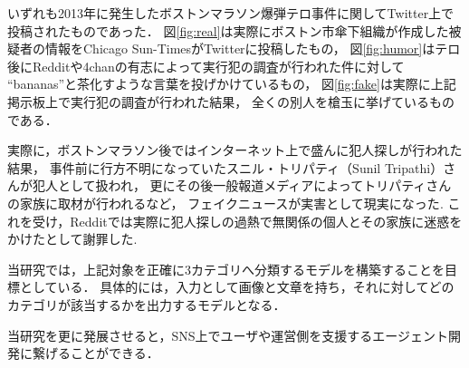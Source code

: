 いずれも2013年に発生したボストンマラソン爆弾テロ事件に関してTwitter上で投稿されたものであった．
図\ref{fig:real}は実際にボストン市傘下組織が作成した被疑者の情報をChicago Sun-TimesがTwitterに投稿したもの，
図\ref{fig:humor}はテロ後にRedditや4chanの有志によって実行犯の調査が行われた件に対して
``bananas''と茶化すような言葉を投げかけているもの，
図\ref{fig:fake}は実際に上記掲示板上で実行犯の調査が行われた結果，
全くの別人を槍玉に挙げているものである．

実際に，ボストンマラソン後ではインターネット上で盛んに犯人探しが行われた結果，
事件前に行方不明になっていたスニル・トリパティ（Sunil Tripathi）さんが犯人として扱われ，
更にその後一般報道メディアによってトリパティさんの家族に取材が行われるなど，
フェイクニュースが実害として現実になった\cite{gray_2013}.
これを受け，Redditでは実際に犯人探しの過熱で無関係の個人とその家族に迷惑をかけたとして謝罪した\cite{laird_2013}.

%
当研究では，上記対象を正確に3カテゴリへ分類するモデルを構築することを目標としている．
具体的には，入力として画像と文章を持ち，それに対してどのカテゴリが該当するかを出力するモデルとなる．

当研究を更に発展させると，SNS上でユーザや運営側を支援するエージェント開発に繋げることができる．
%